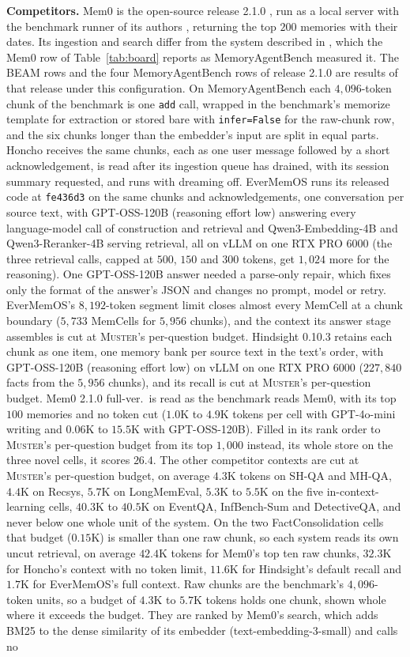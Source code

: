 \documentclass{article}
\newcommand{\sys}{\textsc{Muster}}
\begin{document}
\textbf{Competitors.} Mem0 is the open-source release 2.1.0 \cite{mem0oss}, run as a local server with the
benchmark runner of its authors \cite{mem0bench}, returning the top $200$ memories with their dates. Its ingestion and search
differ from the system described in \cite{mem0}, which the Mem0 row of Table~\ref{tab:board} reports as
MemoryAgentBench measured it. The BEAM rows and the four MemoryAgentBench rows of release 2.1.0 are results of that release under this configuration. On MemoryAgentBench each $4{,}096$-token chunk of the benchmark is one \texttt{add} call, wrapped in the benchmark's memorize template for extraction or stored bare with \texttt{infer=False} for the raw-chunk row, and the six chunks longer than the embedder's input are split in equal parts. Honcho receives the same chunks, each as one user message followed by a short acknowledgement, is read after its ingestion queue has drained, with its session summary requested, and runs with dreaming off. EverMemOS runs its released code at \texttt{fe436d3} on the same chunks and acknowledgements, one conversation per source text, with GPT-OSS-120B (reasoning effort low) answering every language-model call of construction and retrieval and Qwen3-Embedding-4B and Qwen3-Reranker-4B serving retrieval, all on vLLM on one RTX PRO 6000 (the three retrieval calls, capped at $500$, $150$ and $300$ tokens, get $1{,}024$ more for the reasoning). One GPT-OSS-120B answer needed a parse-only repair, which fixes only the format of the answer's JSON and changes no prompt, model or retry. EverMemOS's $8{,}192$-token segment limit closes almost every MemCell at a chunk boundary ($5{,}733$ MemCells for $5{,}956$ chunks), and the context its answer stage assembles is cut at \sys{}'s per-question budget. Hindsight 0.10.3 retains each chunk as one item, one memory bank per source text in the text's order, with GPT-OSS-120B (reasoning effort low) on vLLM on one RTX PRO 6000 ($227{,}840$ facts from the $5{,}956$ chunks), and its recall is cut at \sys{}'s per-question budget. Mem0 2.1.0 full-ver.\ is read as the benchmark reads Mem0, with its top $100$ memories and no token cut ($1.0$K to $4.9$K tokens per cell with GPT-4o-mini writing and $0.06$K to $15.5$K with GPT-OSS-120B). Filled in its rank order to \sys{}'s per-question budget from its top $1{,}000$ instead, its whole store on the three novel cells, it scores $26.4$. The other competitor contexts are cut at \sys{}'s per-question budget, on average $4.3$K tokens on SH-QA and MH-QA, $4.4$K on Recsys, $5.7$K on LongMemEval, $5.3$K to $5.5$K on the five in-context-learning cells, $40.3$K to $40.5$K on EventQA, InfBench-Sum and DetectiveQA, and never below one whole unit of the system. On the two FactConsolidation cells that budget ($0.15$K) is smaller than one raw chunk, so each system reads its own uncut retrieval, on average $42.4$K tokens for Mem0's top ten raw chunks, $32.3$K for Honcho's context with no token limit, $11.6$K for Hindsight's default recall and $1.7$K for EverMemOS's full context. Raw chunks are the benchmark's $4{,}096$-token units, so a budget of $4.3$K to $5.7$K tokens holds one chunk, shown whole where it exceeds the budget. They are ranked by Mem0's search, which adds BM25 to the dense similarity of its embedder (text-embedding-3-small) and calls no 
\end{document}
